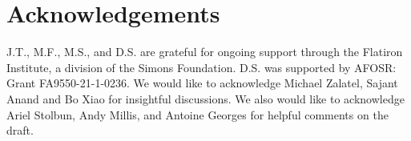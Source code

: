 \documentclass[%
 superscriptaddress,
 amsmath,amssymb,
 prx,
]{revtex4-2}
\begin{document}
\section*{Acknowledgements}
J.T., M.F., M.S., and D.S. are grateful for ongoing support through the Flatiron Institute, a division of the Simons Foundation. D.S. was supported by AFOSR: Grant FA9550-21-1-0236. We would like to acknowledge Michael Zalatel, Sajant Anand and Bo Xiao for insightful discussions. We also would like to acknowledge Ariel Stolbun, Andy Millis, and Antoine Georges for helpful comments on the draft.



\end{document}
